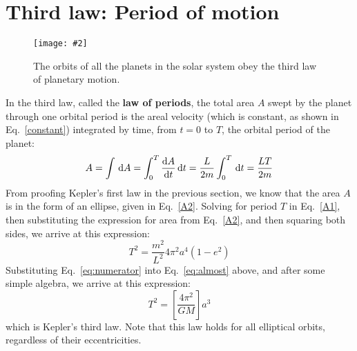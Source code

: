 \documentclass{../../oss-handout}
\newcommand{\pic}[2]{\texttt{[image: \#2]}}
\begin{document}
\section{Third law: Period of motion}
\begin{figure}[!ht]
  \centering
  \pic{.55}{../kep8}
  \caption{The orbits of all the planets in the solar system obey the third
  law of planetary motion.}
  \label{3rdlaw}
\end{figure}
In the third law, called the \textbf{law of periods}, the total area $A$
swept by the planet through one orbital period is the areal velocity (which is
constant, as shown in Eq.\ \ref{constant}) integrated by time, from $t=0$ to
$T$, the orbital period of the planet:
\begin{equation}
  A=\int\dl A=\int_0^T\diff At\dl t=\frac{L}{2m}\int_0^T\dl t=\frac{LT}{2m}
  \label{A1}
\end{equation}
From proofing Kepler's first law in the previous section, we know that the
area $A$ is in the form of an ellipse, given in Eq.~\ref{A2}. Solving for
period $T$ in Eq.~\ref{A1}, then substituting the expression for area from
Eq.~\ref{A2}, and then squaring both sides, we arrive at this expression:
\begin{equation}
  T^2=\frac{m^2}{L^2}4\pi^2a^4(1-e^2)
  \label{eq:almost}
\end{equation}
Substituting Eq.~\ref{eq:numerator} into Eq.\ \ref{eq:almost} above, and after
some simple algebra, we arrive at this expression:
\begin{equation}
  \boxed{T^2=\left[\frac{4\pi^2}{GM}\right] a^3}
\end{equation}
which is Kepler's third law. Note that this law holds for all elliptical
orbits, regardless of their eccentricities.
\end{document}
